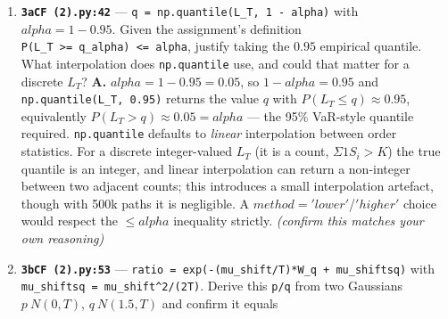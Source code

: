 \documentclass[
  11pt,
]{article}
\begin{document}
\begin{enumerate}
  Derive this exact terminal law from the SDE (your 3a Ito derivation).
  Why is \texttt{0.5*(sigma1\^{}2\ +\ sigma2\^{}2)} the right convexity
  correction, and why is no time-stepping needed? \textbf{A.} The asset
  follows \texttt{dS/S\ =\ r\ dt\ +\ σ1\ dW\ +\ σ2\ dB} with \(W\) the
  common factor and \(B\) the idiosyncratic factor, independent.
  Applying Itô to \(ln S\):
  \(d ln S = (r − ½(σ1²+σ2²))dt + σ1 dW + σ2 dB\), since the total
  quadratic variation of the log is \((σ1²+σ2²)dt\) (W and B
  independent, so no cross term). Integrating to T gives
  \texttt{ln(S\_T/S0)\ =\ (r\ −\ ½(σ1²+σ2²))T\ +\ σ1\ W\_T\ +\ σ2\ B\_T}
  with \texttt{W\_T,\ B\_T\ \textasciitilde{}\ N(0,T)}. So
  \(½(σ1²+σ2²)\) is exactly the Itô convexity correction for the
  \emph{combined} variance. Because the drift and diffusion are
  constant, the SDE has a closed-form lognormal solution at T --- Itô
  integrates exactly --- so no Euler time-stepping is needed; one draw
  of \texttt{(W\_T,\ B\_i)} gives \(S_T\) exactly. (Note:
  \texttt{Wt{[}:,None{]}} broadcasts the single common shock across all
  1000 stocks; \(Bi\) is the per-stock idiosyncratic shock.)
\item
  \textbf{\texttt{3aCF\ (2).py:42}} ---
  \texttt{q\ =\ np.quantile(L\_T,\ 1\ -\ alpha)} with
  \(alpha = 1 - 0.95\). Given the assignment's definition
  \texttt{P(L\_T\ \textgreater{}=\ q\_alpha)\ \textless{}=\ alpha},
  justify taking the \(0.95\) empirical quantile. What interpolation
  does \texttt{np.quantile} use, and could that matter for a discrete
  \(L_T\)? \textbf{A.} \(alpha = 1 − 0.95 = 0.05\), so
  \(1 − alpha = 0.95\) and \texttt{np.quantile(L\_T,\ 0.95)} returns the
  value \(q\) with \(P(L_T ≤ q) ≈ 0.95\), equivalently
  \(P(L_T > q) ≈ 0.05 = alpha\) --- the 95\% VaR-style quantile
  required. \texttt{np.quantile} defaults to \emph{linear} interpolation
  between order statistics. For a discrete integer-valued \(L_T\) (it is
  a count, \(Σ 1{S_i>K}\)) the true quantile is an integer, and linear
  interpolation can return a non-integer between two adjacent counts;
  this introduces a small interpolation artefact, though with 500k paths
  it is negligible. A \(method='lower'\)/\('higher'\) choice would
  respect the \(≤ alpha\) inequality strictly. \emph{(confirm this
  matches your own reasoning)}
\item
  \textbf{\texttt{3bCF\ (2).py:53}} ---
  \texttt{ratio\ =\ exp(-(mu\_shift/T)*W\_q\ +\ mu\_shiftsq)} with
  \texttt{mu\_shiftsq\ =\ mu\_shift\^{}2/(2T)}. Derive this \texttt{p/q}
  from two Gaussians \(p~N(0,T)\), \(q~N(1.5,T)\) and confirm it equals

\end{enumerate}
\end{document}
